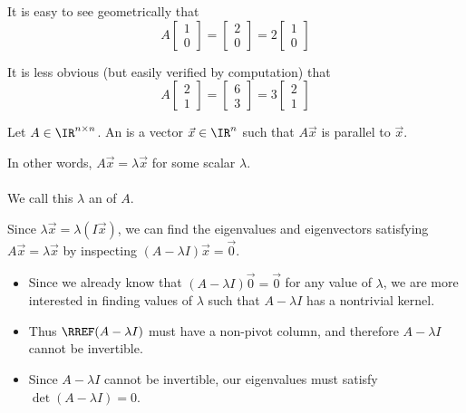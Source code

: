 \begin{applicationActivities}
\begin{observation}
\begin{center}
\end{center}
It is easy to see geometrically that  $$ A\begin{bmatrix}1 \\ 0 \end{bmatrix} = \begin{bmatrix}2 \\ 0 \end{bmatrix}= 2 \begin{bmatrix}1 \\ 0 \end{bmatrix}$$

It is less obvious (but easily verified by computation) that
$$A\begin{bmatrix} 2 \\ 1 \end{bmatrix} = \begin{bmatrix} 6 \\ 3 \end{bmatrix} = 3\begin{bmatrix} 2 \\ 1 \end{bmatrix}$$
\end{observation}

\begin{definition}Let $A \in \IR^{n \times n}$.
An  is a vector $\vec{x} \in \IR^n$ such that $A\vec{x}$ is parallel to $\vec{x}$.

In other words, $A\vec{x}=\lambda \vec{x}$ for some scalar $\lambda$. \\

\ \\

We call this \(\lambda\) an  of \(A\).
\end{definition}

\begin{observation}
Since \(\lambda\vec x=\lambda (I\vec x)\), we can find the eigenvalues and
eigenvectors satisfying $A\vec{x}=\lambda \vec{x}$ by inspecting
$(A-\lambda I)\vec{x} = \vec0$.
\begin{itemize}
\item Since we already know that $(A-\lambda I)\vec0 = \vec0$
for any value of \(\lambda\),
we are more interested in finding values of $\lambda$ such that
$A-\lambda I$ has a nontrivial kernel.
\item Thus \(\RREF(A-\lambda I)\) must have a non-pivot column, and therefore
\(A-\lambda I\) cannot be invertible.
\item
Since \(A-\lambda I\) cannot be invertible, our eigenvalues must satisfy
\(\det(A-\lambda I)=0\).
\end{itemize}
\end{observation}


\end{applicationActivities}
